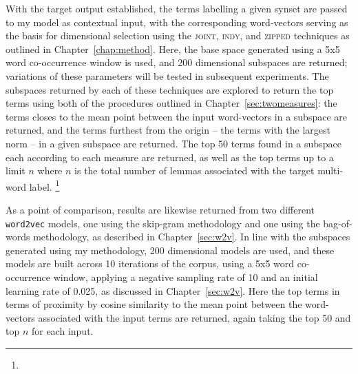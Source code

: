 With the target output established, the terms labelling a given synset are passed to my model as contextual input, with the corresponding word-vectors serving as the basis for dimensional selection using the \textsc{joint}, \textsc{indy}, and \textsc{zipped} techniques as outlined in Chapter~\ref{chap:method}.  Here, the base space generated using a 5x5 word co-occurrence window is used, and 200 dimensional subspaces are returned; variations of these parameters will be tested in subsequent experiments.  The subspaces returned by each of these techniques are explored to return the top terms using both of the procedures outlined in Chapter~\ref{sec:twomeasures}: the terms closes to the mean point between the input word-vectors in a subspace are returned, and the terms furthest from the origin -- the terms with the largest norm -- in a given subspace are returned.  The top 50 terms found in a subspace each according to each measure are returned, as well as the top terms up to a limit $n$ where $n$ is the total number of lemmas associated with the target multi-word label.   \footnote{}

As a point of comparison, results are likewise returned from two different \texttt{word2vec} models, one using the skip-gram methodology and one using the bag-of-words methodology, as described in Chapter~\ref{sec:w2v}.  In line with the subspaces generated using my methodology, 200 dimensional models are used, and these models are built across 10 iterations of the corpus, using a 5x5 word co-occurrence window, applying a negative sampling rate of 10 and an initial learning rate of 0.025, as discussed in Chapter~\ref{sec:w2v}.  Here the top terms in terms of proximity by cosine similarity to the mean point between the word-vectors associated with the input terms are returned, again taking the top 50 and top $n$ for each input.


